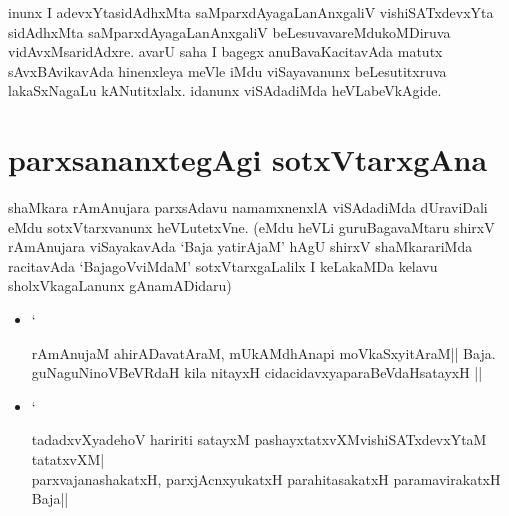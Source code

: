 inunx I adevxYtasidAdhxMta saMparxdAyagaLanAnxgaliV vishiSATxdevxYta sidAdhxMta saMparxdAyagaLanAnxgaliV beLesuvavareMdukoMDiruva vidAvxMsaridAdxre. avarU saha I bagegx anuBavaKacitavAda matutx sAvxBAvikavAda hinenxleya meVle iMdu viSayavanunx beLesutitxruva lakaSxNagaLu kANutitxlalx. idanunx viSAdadiMda heVLabeVkAgide.

\section*{parxsananxtegAgi sotxVtarxgAna}

shaMkara rAmAnujara parxsAdavu namamxnenxlA viSAdadiMda dUraviDali eMdu sotxVtarxvanunx heVLutetxVne. (eMdu heVLi guruBagavaMtaru shirxV rAmAnujara viSayakavAda `Baja yatirAjaM' hAgU shirxV shaMkarariMda racitavAda `BajagoVviMdaM' sotxVtarxgaLalilx I keLakaMDa kelavu sholxVkagaLanunx gAnamADidaru)

\begin{itemize}

 `

\item[] `
\begin{shloka}
rAmAnujaM ahirADavatAraM, mUkAMdhAnapi moVkaSxyitAraM|| Baja.\\
guNaguNinoVBeVRdaH kila nitayxH cidacidavxyaparaBeVdaHsatayxH || 
\end{shloka}

\item[] `
\begin{shloka}
tadadxvXyadehoV haririti satayxM pashayxtatxvXMvishiSATxdevxYtaM tatatxvXM|\\
parxvajanashakatxH, parxjAcnxyukatxH parahitasakatxH paramavirakatxH Baja||
\end{shloka}

 

\end{itemize}


